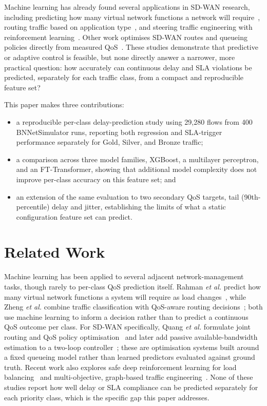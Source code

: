 \documentclass[12pt,onecolumn]{IEEEtran}
\begin{document}
Machine learning has already found several applications in SD-WAN research, including predicting how many virtual network functions a network will require~\cite{rahman2019autoscaling}, routing traffic based on application type~\cite{zheng2022applicationaware}, and steering traffic engineering with reinforcement learning~\cite{dinh2024safeloadbalancing,chen2025mteal}. Other work optimises SD-WAN routes and queueing policies directly from measured QoS~\cite{quang2022routing,quang2023globalqos}. These studies demonstrate that predictive or adaptive control is feasible, but none directly answer a narrower, more practical question: how accurately can continuous delay and SLA violations be predicted, separately for each traffic class, from a compact and reproducible feature set?

This paper makes three contributions:
\begin{itemize}
    \item a reproducible per-class delay-prediction study using 29,280 flows from 400 BNNetSimulator runs, reporting both regression and SLA-trigger performance separately for Gold, Silver, and Bronze traffic;
    \item a comparison across three model families, XGBoost, a multilayer perceptron, and an FT-Transformer, showing that additional model complexity does not improve per-class accuracy on this feature set; and
    \item an extension of the same evaluation to two secondary QoS targets, tail (90th-percentile) delay and jitter, establishing the limits of what a static configuration feature set can predict.
\end{itemize}

\section{Related Work}

Machine learning has been applied to several adjacent network-management tasks, though rarely to per-class QoS prediction itself. Rahman \emph{et al.} predict how many virtual network functions a system will require as load changes~\cite{rahman2019autoscaling}, while Zheng \emph{et al.} combine traffic classification with QoS-aware routing decisions~\cite{zheng2022applicationaware}; both use machine learning to inform a decision rather than to predict a continuous QoS outcome per class. For SD-WAN specifically, Quang \emph{et al.} formulate joint routing and QoS policy optimisation~\cite{quang2022routing} and later add passive available-bandwidth estimation to a two-loop controller~\cite{quang2023globalqos}; these are optimisation systems built around a fixed queueing model rather than learned predictors evaluated against ground truth. Recent work also explores safe deep reinforcement learning for load balancing~\cite{dinh2024safeloadbalancing} and multi-objective, graph-based traffic engineering~\cite{chen2025mteal}. None of these studies report how well delay or SLA compliance can be predicted separately for each priority class, which is the specific gap this paper addresses.
\end{document}
